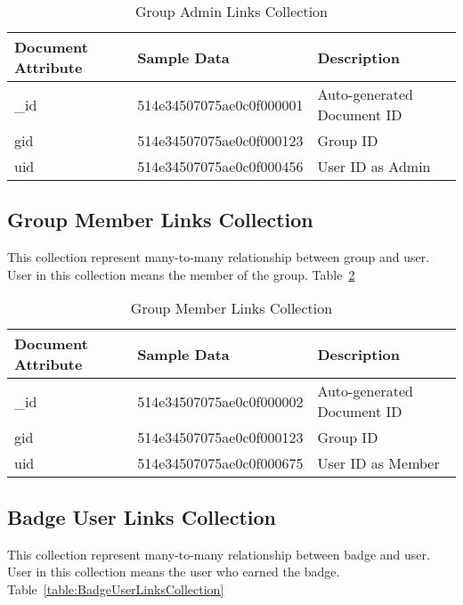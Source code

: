 \begin{table}[H]
\caption{Group Admin Links Collection}\label{table:GroupAdminLinksCollection}
\textbf{ }
\begin{center}
\begin{tabular}{ | l | l |  l | }
\hline
Document Attribute & Sample Data & Description \\ \hline
{\_}id & 514e34507075ae0c0f000001 & Auto-generated Document ID \\ \hline
gid & 514e34507075ae0c0f000123 & Group ID   \\ \hline
uid & 514e34507075ae0c0f000456 & User ID as Admin   \\ \hline
\end{tabular}
\end{center}
\end{table}

\subsection{Group Member Links Collection}
This collection represent many-to-many relationship between group and user. User in this collection means the member of the group. Table~\ref{table:GroupMemberLinksCollection}

\begin{table}[H]
\caption{Group Member Links Collection}\label{table:GroupMemberLinksCollection}
\textbf{ }
\begin{center}
\begin{tabular}{ | l | l |  l | }
\hline
Document Attribute & Sample Data & Description \\ \hline
{\_}id & 514e34507075ae0c0f000002 & Auto-generated Document ID \\ \hline
gid & 514e34507075ae0c0f000123 & Group ID   \\ \hline
uid & 514e34507075ae0c0f000675 & User ID as Member   \\ \hline
\end{tabular}
\end{center}
\end{table}


\subsection{Badge User Links Collection}
This collection represent many-to-many relationship between badge and user. User in this collection means the user who earned the badge. Table~\ref{table:BadgeUserLinksCollection}

